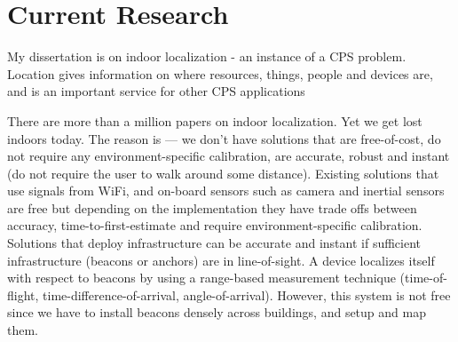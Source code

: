 \documentclass[10pt]{article}
\begin{document}

\section{Current Research}

My dissertation is on indoor localization - an instance of a CPS problem. Location gives information on where resources, things, people and devices are, and is an important service for other CPS applications

There are more than a million papers on indoor localization. Yet we get lost indoors today. The reason is --- we don't have solutions that are free-of-cost, do not require any environment-specific calibration, are accurate, robust and instant (do not require the user to walk around some distance). Existing solutions that use signals from WiFi, and on-board sensors such as camera and inertial sensors are free but depending on the implementation they have trade offs between accuracy, time-to-first-estimate and require environment-specific calibration. Solutions that deploy infrastructure can be accurate and instant if sufficient infrastructure (beacons or anchors) are in line-of-sight. A device localizes itself with respect to beacons by using a range-based measurement technique (time-of-flight, time-difference-of-arrival, angle-of-arrival). However, this system is not free since we have to install beacons densely across buildings, and setup and map them. \\
\end{document}
